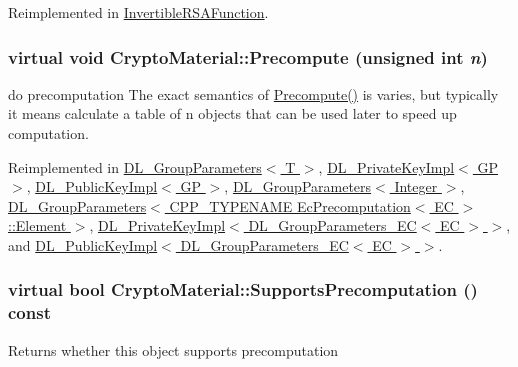 Reimplemented in \hyperlink{class_invertible_r_s_a_function_ad8a540a6369b9043d082b0dc38b99d4b}{InvertibleRSAFunction}.\hypertarget{class_crypto_material_a39e512d2ea70d0e967db98c19994a7fd}{
\subsubsection[{Precompute}]{\setlength{\rightskip}{0pt plus 5cm}virtual void CryptoMaterial::Precompute (unsigned int {\em n})}}
\label{class_crypto_material_a39e512d2ea70d0e967db98c19994a7fd}


do precomputation The exact semantics of \hyperlink{class_crypto_material_a39e512d2ea70d0e967db98c19994a7fd}{Precompute()} is varies, but typically it means calculate a table of n objects that can be used later to speed up computation. 

Reimplemented in \hyperlink{class_d_l___group_parameters_a5f04ae8b4d0b9410a046af1607fbbb6f}{DL\_\-GroupParameters$<$ T $>$}, \hyperlink{class_d_l___private_key_impl_ac1876a3d292e192186070869be896ded}{DL\_\-PrivateKeyImpl$<$ GP $>$}, \hyperlink{class_d_l___public_key_impl_a95e25f6632ec2621289d10abc557b17b}{DL\_\-PublicKeyImpl$<$ GP $>$}, \hyperlink{class_d_l___group_parameters_a5f04ae8b4d0b9410a046af1607fbbb6f}{DL\_\-GroupParameters$<$ Integer $>$}, \hyperlink{class_d_l___group_parameters_a5f04ae8b4d0b9410a046af1607fbbb6f}{DL\_\-GroupParameters$<$ CPP\_\-TYPENAME EcPrecomputation$<$ EC $>$::Element $>$}, \hyperlink{class_d_l___private_key_impl_ac1876a3d292e192186070869be896ded}{DL\_\-PrivateKeyImpl$<$ DL\_\-GroupParameters\_\-EC$<$ EC $>$ $>$}, and \hyperlink{class_d_l___public_key_impl_a95e25f6632ec2621289d10abc557b17b}{DL\_\-PublicKeyImpl$<$ DL\_\-GroupParameters\_\-EC$<$ EC $>$ $>$}.\hypertarget{class_crypto_material_a64ab4ff4adfcfc2da59706ac32895b50}{
\subsubsection[{SupportsPrecomputation}]{\setlength{\rightskip}{0pt plus 5cm}virtual bool CryptoMaterial::SupportsPrecomputation () const}}
\label{class_crypto_material_a64ab4ff4adfcfc2da59706ac32895b50}
\begin{DoxyReturn}{Returns}
whether this object supports precomputation 
\end{DoxyReturn}



